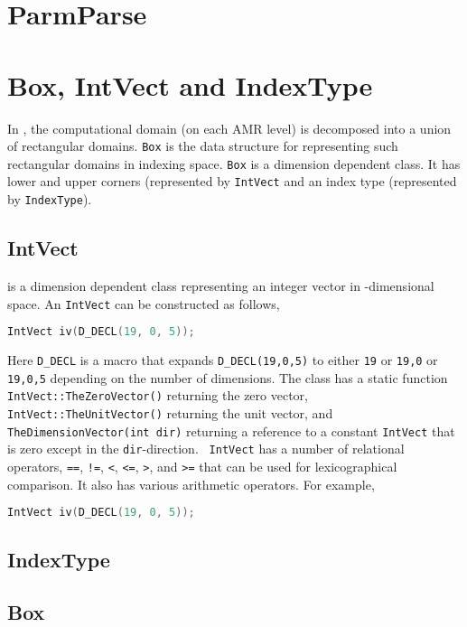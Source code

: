 \section{ParmParse}

\section{Box, IntVect and IndexType}
\label{sec:basics:box}

In \amrex, the computational domain (on each AMR level) is decomposed
into a union of rectangular domains.  {\tt Box} is the data
structure for representing such rectangular domains in indexing space.
{\tt Box} is a dimension dependent class.  It has lower and upper
corners (represented by {\tt IntVect} and an index type
(represented by {\tt IndexType}).

\subsection{IntVect}

{} is a dimension dependent class representing an
integer vector in {}-dimensional space.  An
{\tt IntVect} can be constructed as follows,
\begin{lstlisting}[language=cpp]
    IntVect iv(D_DECL(19, 0, 5));
\end{lstlisting}
Here {\tt D\_DECL} is a macro that expands {\tt D\_DECL(19,0,5)} to
either {\tt 19} or {\tt 19,0} or {\tt 19,0,5} depending on the number
of dimensions.  The class has a static function {\tt
  IntVect::TheZeroVector()} returning the zero vector, {\tt
  IntVect::TheUnitVector()} returning the unit vector, and {\tt
  TheDimensionVector(int dir)} returning a reference to a constant
{\tt IntVect} that is zero except in the {\tt dir}-direction.  {\tt
  IntVect} has a number of relational operators, {\tt ==}, {\tt !=},
{\tt <}, {\tt <=}, {\tt >}, and {\tt >=} that can be used for
lexicographical comparison.  It also has various arithmetic operators.
For example,
\begin{lstlisting}[language=cpp]
    IntVect iv(D_DECL(19, 0, 5));
\end{lstlisting}


\subsection{IndexType}

\subsection{Box}

